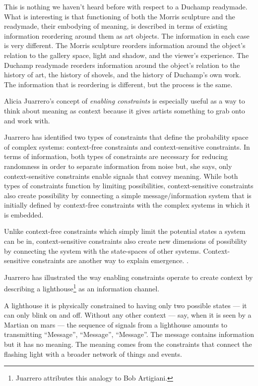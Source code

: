 \documentclass[letterpaper]{article}
\begin{document}
    This is nothing we haven't heard before with respect to a Duchamp readymade. What is interesting is that functioning of both the Morris sculpture and the readymade, their embodying of meaning, is described in terms of existing information reordering around them as art objects. The information in each case is very different. The Morris sculpture reorders information around the object's relation to the gallery space, light and shadow, and the viewer's experience. The Duchamp readymade reorders information around the object's relation to the history of art, the history of shovels, and the history of Duchamp's own work. The information that is reordering is different, but the process is the same.

    Alicia Juarrero's concept of \emph{enabling constraints} is especially useful as a way to think about meaning as context because it gives artists something to grab onto and work with.
    
    Juarrero has identified two types of constraints that define the probability space of complex systems: context-free constraints and context-sensitive constraints. In terms of information, both types of constraints are necessary for reducing randomness in order to separate information from noise but, she says, only context-sensitive constraints enable signals that convey meaning. While both types of constraints function by limiting possibilities, context-sensitive constraints also create possibility by connecting a simple message/information system that is initially defined by context-free constraints with the complex systems in which it is embedded.
    
    Unlike context-free constraints which simply limit the potential states a system can be in, context-sensitive constraints also create new dimensions of possibility by connecting the system with the state-spaces of other systems. Context-sensitive constraints are another way to explain emergence. \citep[p.240]{JuarreroCsltyAsCnstrnt1998}.

    Juarrero has illustrated the way enabling constraints operate to create context by describing a lighthouse\footnote{

        Juarrero attributes this analogy to Bob Artigiani.

    } as an information channel.
    
    A lighthouse it is physically constrained to having only two possible states — it can only blink on and off. Without any other context — say, when it is seen by a Martian on mars — the sequence of signals from a lighthouse amounts to transmitting “Message”, “Message”, “Message”. The message contains information but it has no meaning. The meaning comes from the constraints that connect the flashing light with a broader network of things and events.
\end{document}
